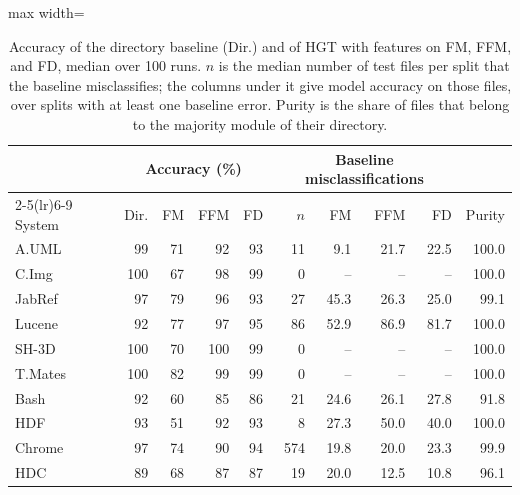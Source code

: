 \begin{table}[h]
\centering
\caption{\fontsize{9.4}{12}\selectfont Accuracy of the directory baseline (Dir.) and of HGT with \ft{} features on FM, FFM, and FD, median over 100 runs. $n$ is the median number of test files per split that the baseline misclassifies; the columns under it give model accuracy on those files, over splits with at least one baseline error. Purity is the share of files that belong to the majority module of their directory.\label{tab:dir_baseline}}
\begin{adjustbox}{max width=\linewidth}
\normalsize
\renewcommand{\arraystretch}{1.1}
\begin{tabular}{lrrrrrrrrr}
\toprule
& \multicolumn{4}{c}{Accuracy (\%)} & \multicolumn{4}{c}{Baseline misclassifications} & \\
\cmidrule(lr){2-5}\cmidrule(lr){6-9}
System & Dir. & FM & FFM & FD & $n$ & FM & FFM & FD & Purity \\
\midrule
A.UML   & 99  & 71 & 92  & 93 & 11   & 9.1  & 21.7 & 22.5 & 100.0 \\
C.Img   & 100 & 67 & 98  & 99 & 0    & --   & --   & --   & 100.0 \\
JabRef  & 97  & 79 & 96  & 93 & 27   & 45.3 & 26.3 & 25.0 & 99.1  \\
Lucene  & 92  & 77 & 97  & 95 & 86 & 52.9 & 86.9 & 81.7 & 100.0 \\
SH-3D   & 100 & 70 & 100 & 99 & 0    & --   & --   & --   & 100.0 \\
T.Mates & 100 & 82 & 99  & 99 & 0    & --   & --   & --   & 100.0 \\
Bash    & 92  & 60 & 85  & 86 & 21   & 24.6 & 26.1 & 27.8 & 91.8  \\
HDF     & 93  & 51 & 92  & 93 & 8    & 27.3 & 50.0 & 40.0 & 100.0 \\
Chrome  & 97  & 74 & 90  & 94 & 574  & 19.8 & 20.0 & 23.3 & 99.9  \\
HDC     & 89  & 68 & 87  & 87 & 19   & 20.0 & 12.5 & 10.8 & 96.1  \\
\bottomrule
\end{tabular}
\end{adjustbox}
\end{table}